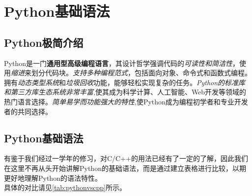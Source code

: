 \chapter{Python基础语法}
\label{cp:pythonbasics}

\section{Python极简介绍}

Python是一门\textbf{通用型高级编程语言}，其设计哲学强调代码的\textit{可读性和简洁性}，使用\textit{缩进}来划分代码块。\textit{支持多种编程范式}，包括面向对象、命令式和函数式编程。拥有\textit{动态类型系统}和\textit{垃圾回收}功能，能够轻松实现复杂的任务。\textit{Python的标准库和第三方库生态系统非常丰富},使其成为科学计算、人工智能、Web开发等领域的热门语言选择。\textit{简单易学而功能强大的特性},使Python成为编程初学者和专业开发者的共同选择。

\section{Python基础语法}

有鉴于我们经过一学年的修习，对C/C++的用法已经有了一定的了解，因此我们在这里不再从头开始讲解Python的基础语法，而是通过建立表格进行比较，以期更好地理解Python的语法特性。\\

具体的对比请见\autoref{tab:pythonvscpp}所示。


